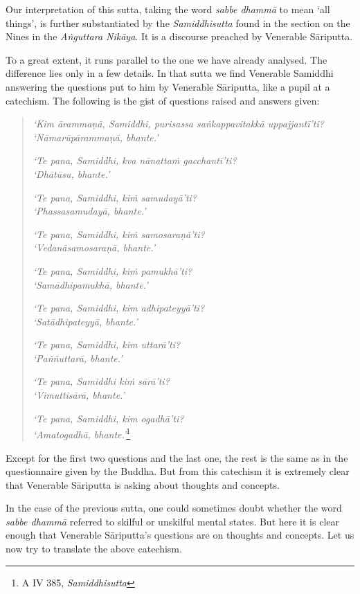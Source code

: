 Our interpretation of this sutta, taking the word \emph{sabbe dhammā} to mean `all things', is further substantiated by the \emph{Samiddhisutta} found in the section on the Nines in the \emph{Aṅguttara Nikāya}. It is a discourse preached by Venerable Sāriputta.

To a great extent, it runs parallel to the one we have already analysed. The difference lies only in a few details. In that sutta we find Venerable Samiddhi answering the questions put to him by Venerable Sāriputta, like a pupil at a catechism. The following is the gist of questions raised and answers given:

\begin{quote}
\emph{`Kim ārammaṇā, Samiddhi, purisassa saṅkappavitakkā uppajjantī'ti?}\\
\emph{`Nāmarūpārammaṇā, bhante.'}

\emph{`Te pana, Samiddhi, kva nānattaṁ gacchantī'ti?}\\
\emph{`Dhātūsu, bhante.'}

\emph{`Te pana, Samiddhi, kiṁ samudayā'ti?}\\
\emph{`Phassasamudayā, bhante.'}

\emph{`Te pana, Samiddhi, kiṁ samosaraṇā'ti?}\\
\emph{`Vedanāsamosaraṇā, bhante.'}

\emph{`Te pana, Samiddhi, kiṁ pamukhā'ti?}\\
\emph{`Samādhipamukhā, bhante.'}

\emph{`Te pana, Samiddhi, kim adhipateyyā'ti?}\\
\emph{`Satādhipateyyā, bhante.'}

\emph{`Te pana, Samiddhi, kim uttarā'ti?}\\
\emph{`Paññuttarā, bhante.'}

\emph{`Te pana, Samiddhi kiṁ sārā'ti?}\\
\emph{`Vimuttisārā, bhante.'}

\emph{`Te pana, Samiddhi, kim ogadhā'ti?}\\
\emph{`Amatogadhā, bhante.'}\footnote{A IV 385, \emph{Samiddhisutta}}
\end{quote}

Except for the first two questions and the last one, the rest is the same as in the questionnaire given by the Buddha. But from this catechism it is extremely clear that Venerable Sāriputta is asking about thoughts and concepts.

In the case of the previous sutta, one could sometimes doubt whether the word \emph{sabbe dhammā} referred to skilful or unskilful mental states. But here it is clear enough that Venerable Sāriputta's questions are on thoughts and concepts. Let us now try to translate the above catechism.

